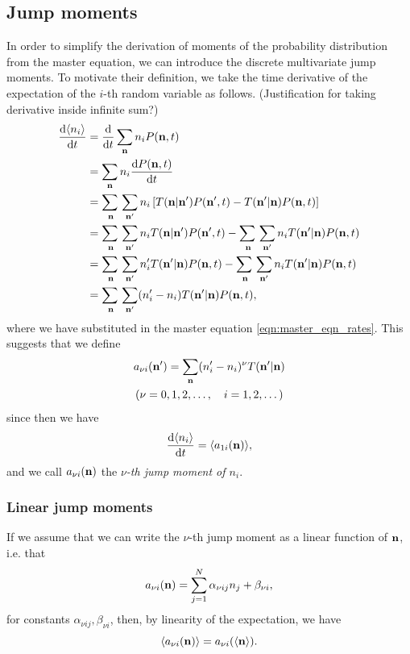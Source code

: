 \subsection{Jump moments}
In order to simplify the derivation of moments of the probability distribution
from the master equation, we can introduce the discrete multivariate jump
moments. To motivate their definition, we take the time derivative of the
expectation of the \(i\)-th random variable as follows. (Justification for
taking derivative inside infinite sum?)
\begin{align*}
    \diff{\E{n_i}}{t} &= \diff{}{t}\sum_{\V{n}}n_i P(\V{n},t)\\
    &= \sum_{\V{n}}n_i \diff{P(\V{n},t)}{t}\\
    &= \adjustlimits\sum_{\V{n}}\sum_{\V{n}'} n_i \left[ T(\V{n}|\V{n}') P(\V{n}',t) -
    T(\V{n}'|\V{n}) P(\V{n},t)\right]\\
    &= \adjustlimits\sum_{\V{n}}\sum_{\V{n}'} n_i T(\V{n}|\V{n}') P(\V{n}',t) -
    \adjustlimits\sum_{\V{n}}\sum_{\V{n}'} n_i T(\V{n}'|\V{n}) P(\V{n},t)\\
    &= \adjustlimits\sum_{\V{n}}\sum_{\V{n}'} n_i' T(\V{n}'|\V{n}) P(\V{n},t) -
    \adjustlimits\sum_{\V{n}}\sum_{\V{n}'} n_i T(\V{n}'|\V{n}) P(\V{n},t)\\
    &= \adjustlimits\sum_{\V{n}}\sum_{\V{n}'} (n_i' - n_i) T(\V{n}'|\V{n})
    P(\V{n},t),
\end{align*}
where we have substituted in the master equation \eqref{eqn:master_eqn_rates}.
This suggests that we define
\begin{equation}
    \begin{gathered}
        a_{\nu i}(\mathbf{n}') = \sum_{\mathbf{n}} (n_i'-n_i)^\nu T(\mathbf{n}'|\mathbf{n})\\
        (\nu = 0,1,2,\dotsc,\quad i=1,2,\dotsc)
    \end{gathered}
    \label{eqn:jump_moment}
\end{equation}
since then we have
\begin{equation}
    \frac{\mathrm{d} \langle n_i \rangle}{\mathrm{d} t} = \langle a_{1i}(\mathbf{n}) \rangle,
    \label{eqn:time_evo_expectation_jump_moment}
\end{equation}
and we call \(a_{\nu i}(\mathbf{n})\) the \emph{\(\nu\)-th jump moment of \(n_i\)}.

\subsubsection{Linear jump moments}
If we assume that we can write the \(\nu\)-th jump moment as a linear function of
\(\mathbf{n}\), i.e. that
\begin{equation}
    a_{\nu i}(\mathbf{n}) = \sum_{j=1}^{N} \alpha_{\nu i j} n_j + \beta_{\nu i},
    \label{eqn:linear_jump_moments_coeffs}
\end{equation}
for constants \(\alpha_{\nu i j}, \beta_{\nu i}\),
then, by linearity of the expectation, we have
\begin{equation}
    \langle a_{\nu i}(\mathbf{n}) \rangle = a_{\nu i}(\langle \mathbf{n} \rangle).
    \label{eqn:linear_jump_moments}
\end{equation}

